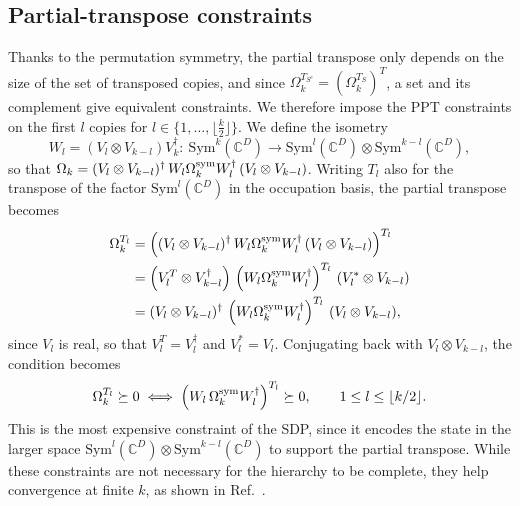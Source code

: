 \documentclass[aps,pra,twocolumn,showpacs,superscriptaddress,groupedaddress]{revtex4-2}
\newcommand{\C}{\mathds{C}}
\begin{document}
\begin{widetext}
\subsection{Partial-transpose constraints}
Thanks to the permutation symmetry, the partial transpose only depends on the size of the set of transposed copies, and since $\Omega_k^{T_{S^c}}=(\Omega_k^{T_S})^T$, a set and its complement give equivalent constraints. We therefore impose the PPT constraints on the first $l$ copies for $l \in \{1, \dots, \lfloor \tfrac{k}{2} \rfloor\}$. We define the isometry
\begin{equation}
    W_l=(V_l\otimes V_{k-l})V_k^\dagger:\ \text{Sym}^k(\C^D)\to\text{Sym}^l(\C^D)\otimes\text{Sym}^{k-l}(\C^D),
\end{equation}
so that $\Omega_k=(V_l\otimes V_{k-l})^\dagger\,W_l\Omega_k^{\rm sym}W_l^\dagger\,(V_l\otimes V_{k-l})$. Writing $T_l$ also for the transpose of the factor $\text{Sym}^l(\C^D)$ in the occupation basis, the partial transpose becomes
\begin{align}
    \Omega_k^{T_l} &= \left((V_l\otimes V_{k-l})^\dagger\,W_l\Omega_k^{\rm sym}W_l^\dagger\,(V_l\otimes V_{k-l})\right)^{T_l}\\
    &=\left(V_l^T\otimes V_{k-l}^\dagger\right)\,\left(W_l\Omega_k^{\rm sym}W_l^\dagger\right)^{T_l}\,\left(V_l^*\otimes V_{k-l}\right)\\
    &= (V_l\otimes V_{k-l})^\dagger\,\left(W_l\Omega_k^{\rm sym}W_l^\dagger\right)^{T_l}\,(V_l\otimes V_{k-l}),
\end{align}
since $V_l$ is real, so that $V_l^T=V_l^\dagger$ and $V_l^*=V_l$. Conjugating back with $V_l\otimes V_{k-l}$, the condition becomes
\begin{equation}
    \Omega_k^{T_l}\succeq0\iff\left(W_l\,\Omega_k^{\rm sym}W_l^\dagger\right)^{T_l}\succeq0,\qquad 1\leq l\leq\lfloor k/2\rfloor.
\end{equation}
This is the most expensive constraint of the SDP, since it encodes the state in the larger space $\text{Sym}^l(\C^D)\otimes\text{Sym}^{k-l}(\C^D)$ to support the partial transpose. While these constraints are not necessary for the hierarchy to be complete, they help convergence at finite $k$, as shown in Ref.~\cite{Navascues2009}.


\end{widetext}
\end{document}
